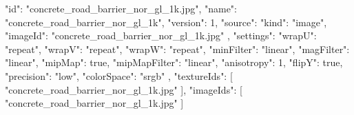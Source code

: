 {
  "id": "concrete_road_barrier_nor_gl_1k.jpg",
  "name": "concrete_road_barrier_nor_gl_1k",
  "version": 1,
  "source": {
    "kind": "image",
    "imageId": "concrete_road_barrier_nor_gl_1k.jpg"
  },
  "settings": {
    "wrapU": "repeat",
    "wrapV": "repeat",
    "wrapW": "repeat",
    "minFilter": "linear",
    "magFilter": "linear",
    "mipMap": true,
    "mipMapFilter": "linear",
    "anisotropy": 1,
    "flipY": true,
    "precision": "low",
    "colorSpace": "srgb"
  },
  "textureIds": [
    "concrete_road_barrier_nor_gl_1k.jpg"
  ],
  "imageIds": [
    "concrete_road_barrier_nor_gl_1k.jpg"
  ]
}
